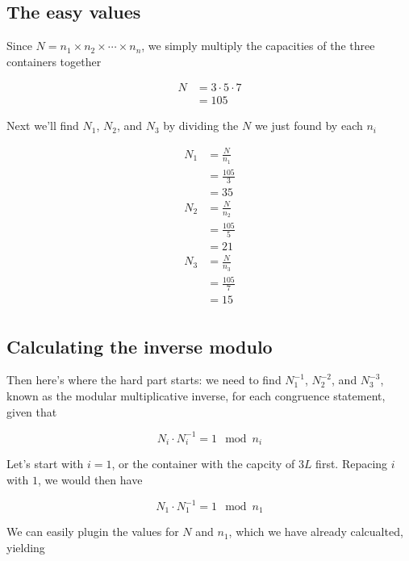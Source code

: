 \documentclass[index]{subfiles}
\begin{document}
\subsection{The easy values}

Since \(N=n_1\times n_2\times\cdots\times n_n\), we simply multiply the capacities of the three containers together

\begin{align*}
    N & =3\cdot5\cdot7 \\
      & =\boxed{105}
\end{align*}

Next we'll find \(N_1\), \(N_2\), and \(N_3\) by dividing the \(N\) we just found by each \(n_i\)

\begin{align*}
    N_1 & =\frac{N}{n_1} \\
        & =\frac{105}{3} \\
        & =\boxed{35}    \\
    N_2 & =\frac{N}{n_2} \\
        & =\frac{105}{5} \\
        & =\boxed{21}    \\
    N_3 & =\frac{N}{n_3} \\
        & =\frac{105}{7} \\
        & =\boxed{15}    \\
\end{align*}

\subsection{Calculating the inverse modulo}

Then here's where the hard part starts: we need to find \(N_1^{-1}\), \(N_2^{-2}\), and \(N_3^{-3}\), known as the modular multiplicative inverse, for each congruence statement, given that

\begin{equation*}
    N_i\cdot N_i^{-1}=1\mod n_i
\end{equation*}

Let's start with \(i=1\), or the container with the capcity of \(3L\) first. Repacing \(i\) with \(1\), we would then have

\begin{equation*}
    N_1\cdot N_1^{-1}=1\mod n_1
\end{equation*}

We can easily plugin the values for \(N\) and \(n_1\), which we have already calcualted, yielding
\end{document}
